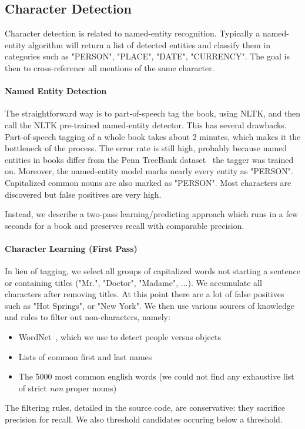 \documentclass[twoside]{article}
\begin{document}
\begin{multicols}{2}
\subsection{Character Detection}

Character detection is related to named-entity recognition. Typically a named-entity algorithm will return a list of detected entities and classify them in categories such as "PERSON", "PLACE", "DATE", "CURRENCY". The goal is then to cross-reference all mentions of the same character.

\paragraph{Named Entity Detection} The straightforward way is to part-of-speech tag the book, using NLTK, and then call the NLTK pre-trained named-entity detector. This has several drawbacks. Part-of-speech tagging of a whole book takes about 2 minutes, which makes it the bottleneck of the process. The error rate is still high, probably because named entities in books differ from the Penn TreeBank dataset~\cite{marcus1993building} the tagger was trained on. Moreover, the named-entity model marks nearly every entity as "PERSON". Capitalized common nouns are also marked as "PERSON". Most characters are discovered but false positives are very high.

Instead, we describe a two-pass learning/predicting approach which runs in a few seconds for a book and preserves recall with comparable precision.

\paragraph{Character Learning (First Pass)} In lieu of tagging, we select all groups of capitalized words not starting a sentence or containing titles ("Mr.", "Doctor", "Madame", ...). We accumulate all characters after removing titles. At this point there are a lot of false positives such as "Hot Springs", or "New York". We then use various sources of knowledge and rules to filter out non-characters, namely:
\begin{itemize}
\item WordNet~\cite{miller1995wordnet}, which we use to detect people versus objects
\item Lists of common first and last names
\item The 5000 most common english words (we could not find any exhaustive list of strict \emph{non} proper nouns)
\end{itemize}
The filtering rules, detailed in the source code, are conservative: they sacrifice precision for recall. We also threshold candidates occuring below a threshold.


\end{multicols}
\end{document}
